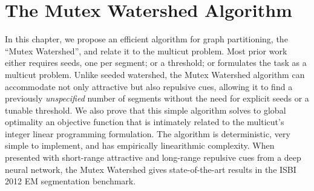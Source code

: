 
\chapter{The Mutex Watershed Algorithm}
In this chapter, we propose an efficient algorithm for graph partitioning, the ``Mutex Watershed'', and relate it to the multicut problem. 
Most prior work either requires seeds, one per segment; or a threshold; or formulates the task as a multicut problem. 
Unlike seeded watershed, the Mutex Watershed algorithm can accommodate not only attractive but also repulsive cues, allowing it to find a previously \emph{unspecified} number of segments without the need for explicit seeds or a tunable threshold. We also prove that this simple algorithm solves to global optimality an objective function that is intimately related to the multicut's integer linear programming formulation. 
The algorithm is deterministic, very simple to implement, and has empirically linearithmic complexity. 
When presented with short-range attractive and long-range repulsive cues from a deep neural network, the Mutex Watershed gives state-of-the-art results in the %
 ISBI 2012 EM segmentation benchmark.

